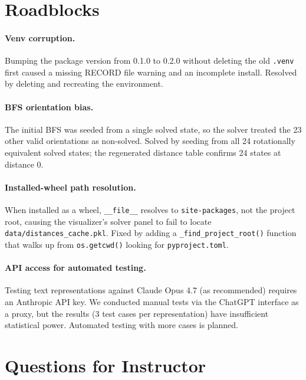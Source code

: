 \documentclass[12pt]{article}
\begin{document}
\section{Roadblocks}

\paragraph{Venv corruption.}
Bumping the package version from 0.1.0 to 0.2.0 without deleting the old
\texttt{.venv} first caused a missing RECORD file warning and an incomplete
install.  Resolved by deleting and recreating the environment.

\paragraph{BFS orientation bias.}
The initial BFS was seeded from a single solved state, so the solver treated the
23 other valid orientations as non-solved.  Solved by seeding from all 24
rotationally equivalent solved states; the regenerated distance table confirms
24 states at distance 0.

\paragraph{Installed-wheel path resolution.}
When installed as a wheel, \texttt{\_\_file\_\_} resolves to
\texttt{site-packages}, not the project root, causing the visualizer's solver
panel to fail to locate \texttt{data/distances\_cache.pkl}.  Fixed by adding a
\texttt{\_find\_project\_root()} function that walks up from \texttt{os.getcwd()}
looking for \texttt{pyproject.toml}.

\paragraph{API access for automated testing.}
Testing text representations against Claude Opus 4.7 (as recommended) requires
an Anthropic API key.  We conducted manual tests via the ChatGPT interface as a
proxy, but the results (3 test cases per representation) have insufficient
statistical power.  Automated testing with more cases is planned.

\section{Questions for Instructor}
\end{document}
